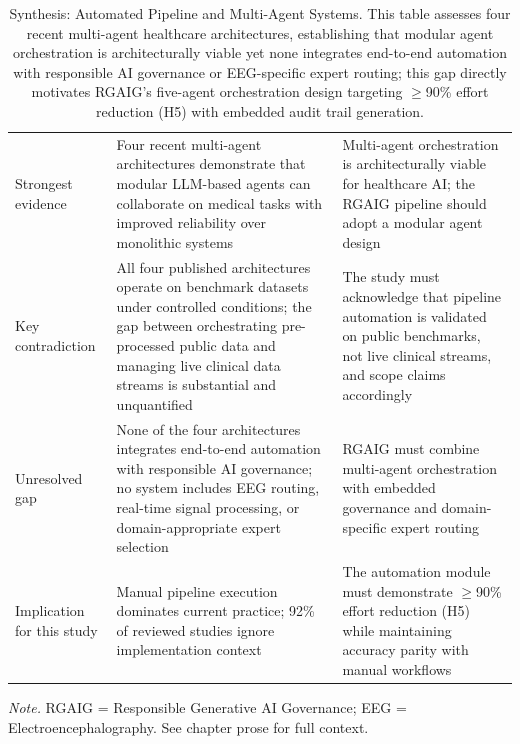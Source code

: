 {\tablestripes\tablefontsize
\begin{xltabular}{\textwidth}{@{} p{2.3cm} p{6.5cm} p{5.6cm} @{}}
\caption[Synthesis: Automated Pipeline and Multi-Agent Systems]{Synthesis: Automated Pipeline and Multi-Agent Systems. This table assesses four recent multi-agent healthcare architectures, establishing that modular agent orchestration is architecturally viable yet none integrates end-to-end automation with responsible AI governance or EEG-specific expert routing; this gap directly motivates RGAIG's five-agent orchestration design targeting $\geq$90\% effort reduction (H5) with embedded audit trail generation.}\label{tab:synth_pipeline_automation} \\
\toprule
{} &  &  \\
\midrule
\endfirsthead
\endhead
\bottomrule
\endlastfoot
Strongest evidence & Four recent multi-agent architectures demonstrate that modular LLM-based agents can collaborate on medical tasks with improved reliability over monolithic systems & Multi-agent orchestration is architecturally viable for healthcare AI; the RGAIG pipeline should adopt a modular agent design \\
\addlinespace
Key contradiction & All four published architectures operate on benchmark datasets under controlled conditions; the gap between orchestrating pre-processed public data and managing live clinical data streams is substantial and unquantified & The study must acknowledge that pipeline automation is validated on public benchmarks, not live clinical streams, and scope claims accordingly \\
\addlinespace
Unresolved gap & None of the four architectures integrates end-to-end automation with responsible AI governance; no system includes EEG routing, real-time signal processing, or domain-appropriate expert selection & RGAIG must combine multi-agent orchestration with embedded governance and domain-specific expert routing \\
\addlinespace
Implication for this study & Manual pipeline execution dominates current practice; 92\% of reviewed studies ignore implementation context & The automation module must demonstrate $\geq$90\% effort reduction (H5) while maintaining accuracy parity with manual workflows \\
\end{xltabular}}
\vspace{0.3em}\noindent\textit{Note.} RGAIG = Responsible Generative AI Governance; EEG = Electroencephalography. See chapter prose for full context.


